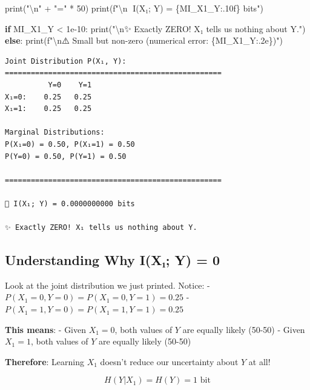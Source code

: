 \documentclass[
  11pt,
  letterpaper,
  oneside,
  openany]{book}
\newenvironment{Shaded}{\begin{snugshade}}{\end{snugshade}}
\newcommand{\BuiltInTok}[1]{\textcolor[rgb]{0.00,0.23,0.31}{#1}}
\newcommand{\CharTok}[1]{\textcolor[rgb]{0.13,0.47,0.30}{#1}}
\newcommand{\ControlFlowTok}[1]{\textcolor[rgb]{0.00,0.23,0.31}{\textbf{#1}}}
\newcommand{\DecValTok}[1]{\textcolor[rgb]{0.68,0.00,0.00}{#1}}
\newcommand{\FloatTok}[1]{\textcolor[rgb]{0.68,0.00,0.00}{#1}}
\newcommand{\NormalTok}[1]{\textcolor[rgb]{0.00,0.23,0.31}{#1}}
\newcommand{\OperatorTok}[1]{\textcolor[rgb]{0.37,0.37,0.37}{#1}}
\newcommand{\SpecialCharTok}[1]{\textcolor[rgb]{0.37,0.37,0.37}{#1}}
\newcommand{\SpecialStringTok}[1]{\textcolor[rgb]{0.13,0.47,0.30}{#1}}
\newcommand{\StringTok}[1]{\textcolor[rgb]{0.13,0.47,0.30}{#1}}
\begin{document}
\begin{Shaded}
\begin{Highlighting}[]
\BuiltInTok{print}\NormalTok{(}\StringTok{"}\CharTok{\textbackslash{}n}\StringTok{"} \OperatorTok{+} \StringTok{"="} \OperatorTok{*} \DecValTok{50}\NormalTok{)}
\BuiltInTok{print}\NormalTok{(}\SpecialStringTok{f"}\CharTok{\textbackslash{}n}\SpecialStringTok{🎯 I(X₁; Y) = }\SpecialCharTok{\{}\NormalTok{MI\_X1\_Y}\SpecialCharTok{:.10f\}}\SpecialStringTok{ bits"}\NormalTok{)}

\ControlFlowTok{if}\NormalTok{ MI\_X1\_Y }\OperatorTok{\textless{}} \FloatTok{1e{-}10}\NormalTok{:}
    \BuiltInTok{print}\NormalTok{(}\StringTok{"}\CharTok{\textbackslash{}n}\StringTok{✨ Exactly ZERO! X₁ tells us nothing about Y."}\NormalTok{)}
\ControlFlowTok{else}\NormalTok{:}
    \BuiltInTok{print}\NormalTok{(}\SpecialStringTok{f"}\CharTok{\textbackslash{}n}\SpecialStringTok{⚠️  Small but non{-}zero (numerical error: }\SpecialCharTok{\{}\NormalTok{MI\_X1\_Y}\SpecialCharTok{:.2e\}}\SpecialStringTok{)"}\NormalTok{)}
\end{Highlighting}
\end{Shaded}

\begin{verbatim}
Joint Distribution P(X₁, Y):
==================================================
          Y=0    Y=1
X₁=0:    0.25   0.25
X₁=1:    0.25   0.25

Marginal Distributions:
P(X₁=0) = 0.50, P(X₁=1) = 0.50
P(Y=0) = 0.50, P(Y=1) = 0.50

==================================================

🎯 I(X₁; Y) = 0.0000000000 bits

✨ Exactly ZERO! X₁ tells us nothing about Y.
\end{verbatim}

\subsection{Understanding Why I(X₁; Y) =
0}\label{understanding-why-ixux2081-y-0}

Look at the joint distribution we just printed. Notice: -
\(P(X_1 = 0, Y = 0) = P(X_1 = 0, Y = 1) = 0.25\) -
\(P(X_1 = 1, Y = 0) = P(X_1 = 1, Y = 1) = 0.25\)

\textbf{This means}: - Given \(X_1 = 0\), both values of \(Y\) are
equally likely (50-50) - Given \(X_1 = 1\), both values of \(Y\) are
equally likely (50-50)

\textbf{Therefore}: Learning \(X_1\) doesn't reduce our uncertainty
about \(Y\) at all!

\[H(Y|X_1) = H(Y) = 1 \text{ bit}\]
\end{document}

